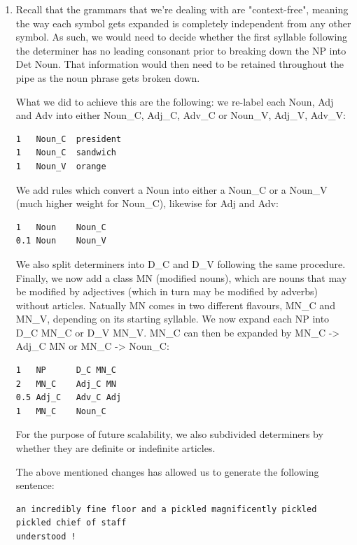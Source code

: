 \documentclass[11pt]{article}
\begin{document}
\begin{enumerate}
      \item Recall that the grammars that we're dealing with are "context-free", meaning the way each symbol gets expanded is completely independent from any other symbol. As such, we would need to decide whether the first syllable following the determiner has no leading consonant prior to breaking down the NP into Det Noun. That information would then need to be retained throughout the pipe as the noun phrase gets broken down.
      
      What we did to achieve this are the following: we re-label each Noun, Adj and Adv into either Noun\_C, Adj\_C, Adv\_C or Noun\_V, Adj\_V, Adv\_V:
      
\begin{verbatim}
1   Noun_C	president
1   Noun_C	sandwich
1   Noun_V  orange
\end{verbatim}
      
      We add rules which convert a Noun into either a Noun\_C or a Noun\_V (much higher weight for Noun\_C), likewise for Adj and Adv:

\begin{verbatim}
1   Noun    Noun_C
0.1 Noun    Noun_V
\end{verbatim}
      
      We also split determiners into D\_C and D\_V following the same procedure. Finally, we now add a class MN (modified nouns), which are nouns that may be modified by adjectives (which in turn may be modified by adverbs) without articles. Natually MN comes in two different flavours, MN\_C and MN\_V, depending on its starting syllable. We now expand each NP into D\_C MN\_C or D\_V MN\_V. MN\_C can then be expanded by MN\_C -> Adj\_C MN or MN\_C -> Noun\_C:

\begin{verbatim}
1   NP      D_C MN_C
2   MN_C    Adj_C MN
0.5 Adj_C   Adv_C Adj
1   MN_C    Noun_C
\end{verbatim}

      For the purpose of future scalability, we also subdivided determiners by whether they are definite or indefinite articles.

      The above mentioned changes has allowed us to generate the following sentence:

\begin{verbatim}
an incredibly fine floor and a pickled magnificently pickled pickled chief of staff 
understood !


\end{verbatim}
\end{enumerate}
\end{document}
